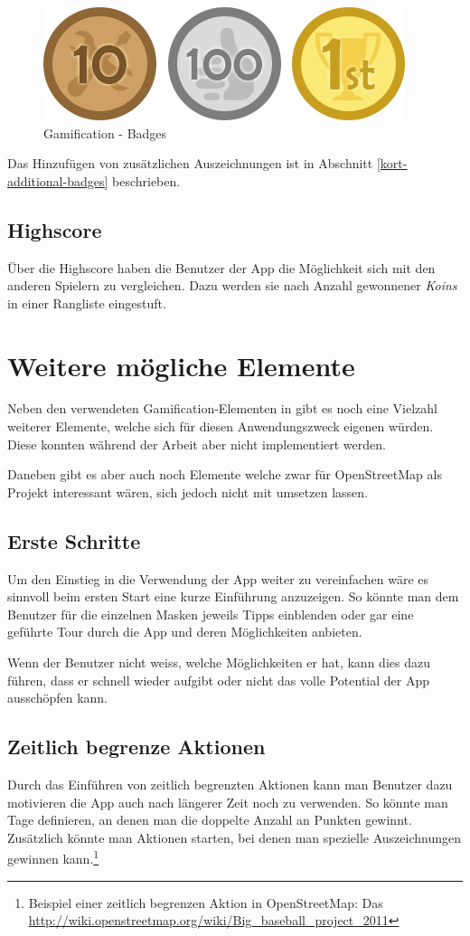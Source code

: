 \begin{figure}[H]
	\centering
	\includegraphics[scale=0.7]{images/gamification/gamification-badges}
	\caption{Gamification - Badges}
	\label{gamification-badges}
\end{figure}

Das Hinzufügen von zusätzlichen Auszeichnungen ist in Abschnitt \ref{kort-additional-badges} beschrieben.

\subsection{Highscore}
Über die Highscore haben die Benutzer der App die Möglichkeit sich mit den anderen Spielern zu vergleichen.
Dazu werden sie nach Anzahl gewonnener \emph{Koins} in einer Rangliste eingestuft.

\section{Weitere mögliche Elemente}
Neben den verwendeten Gamification-Elementen in \kort gibt es noch eine Vielzahl weiterer Elemente, welche sich für diesen Anwendungszweck eigenen würden.
Diese konnten während der Arbeit aber nicht implementiert werden.

Daneben gibt es aber auch noch Elemente welche zwar für OpenStreetMap als Projekt interessant wären, sich jedoch nicht mit \kort umsetzen lassen.

\subsection{Erste Schritte}
Um den Einstieg in die Verwendung der App weiter zu vereinfachen wäre es sinnvoll beim ersten Start eine kurze Einführung anzuzeigen.
So könnte man dem Benutzer für die einzelnen Masken jeweils Tipps einblenden oder gar eine geführte Tour durch die App und deren Möglichkeiten anbieten.

Wenn der Benutzer nicht weiss, welche Möglichkeiten er hat, kann dies dazu führen, dass er schnell wieder aufgibt oder nicht das volle Potential der App ausschöpfen kann.

\subsection{Zeitlich begrenze Aktionen}
Durch das Einführen von zeitlich begrenzten Aktionen kann man Benutzer dazu motivieren die App auch nach längerer Zeit noch zu verwenden.
So könnte man Tage definieren, an denen man die doppelte Anzahl an Punkten gewinnt.
Zusätzlich könnte man Aktionen starten, bei denen man spezielle Auszeichnungen gewinnen kann.\footnote{Beispiel einer zeitlich begrenzen Aktion in \gls{OpenStreetMap}: Das  \url{http://wiki.openstreetmap.org/wiki/Big_baseball_project_2011}}

